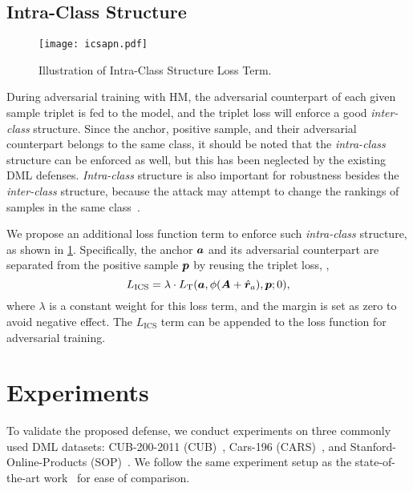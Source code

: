 \documentclass[10pt,twocolumn,letterpaper]{article}
\begin{document}
\subsection{Intra-Class Structure}
\label{sec:33}

\begin{figure}[t]
	\texttt{[image: icsapn.pdf]}
	\caption{Illustration of Intra-Class Structure Loss Term.}
	\label{fig:ics}
\end{figure}


During adversarial training with HM, the adversarial counterpart of each given sample
triplet is fed to the model, and the triplet loss will enforce a good
\emph{inter-class} structure.
%
Since the anchor, positive sample, and their adversarial counterpart belongs to
the same class, it should be noted that the \emph{intra-class} structure can be
enforced as well, but this has been neglected by the existing DML defenses.
%
\emph{Intra-class} structure is also important for robustness besides the
\emph{inter-class} structure, because the attack may attempt to change the
rankings of samples in the same class~\cite{advrank}.


We propose an additional loss function term to enforce such \emph{intra-class}
structure, as shown in \cref{fig:ics}.
%
Specifically, the anchor ${\bm{a}}$ and its adversarial counterpart
are separated from the positive sample ${\bm{p}}$ by reusing the triplet loss,
\ie,
%
\begin{equation}
	L_\text{ICS} = \lambda \cdot L_\text{T}(
	{\bm{a}}, \phi({\bm{A}} + \hat{{\bm{r}}}_a), {\bm{p}}; 0),
\end{equation}
%
where $\lambda$ is a constant weight for this loss term,
and the margin is set as zero to avoid negative effect.
%
The $L_\text{ICS}$ term can be appended to the loss function for
adversarial training.

\section{Experiments}
\label{sec:4}


To validate the proposed defense, we conduct experiments
on three commonly used DML datasets: CUB-200-2011 (CUB)~\cite{cub200}, Cars-196
(CARS)~\cite{cars196}, and Stanford-Online-Products (SOP)~\cite{sop}.
%
We follow the same experiment setup as the state-of-the-art work~\cite{robrank,revisiting}
for ease of comparison.
\end{document}
